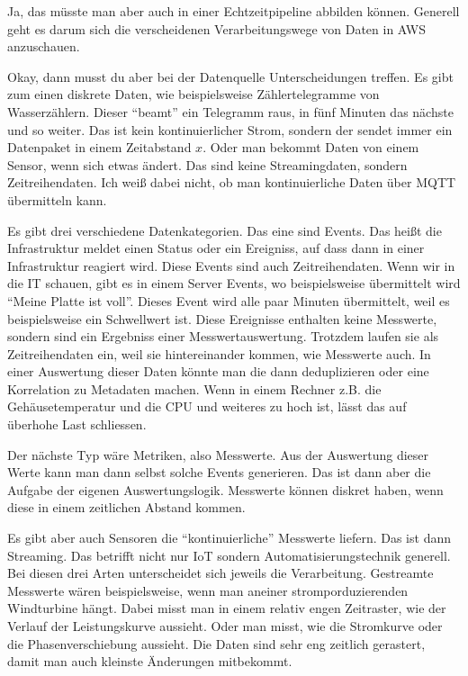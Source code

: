\LF Ja, das müsste man aber auch in einer Echtzeitpipeline abbilden können. Generell geht es darum sich die verscheidenen Verarbeitungswege von Daten in \ac{AWS} anzuschauen. 

\PE Okay, dann musst du aber bei der Datenquelle Unterscheidungen treffen. Es gibt zum einen diskrete Daten, wie beispielsweise Zählertelegramme von Wasserzählern. Dieser \enquote{beamt} ein Telegramm raus, in fünf Minuten das nächste und so weiter. Das ist kein kontinuierlicher Strom, sondern der sendet immer ein Datenpaket in einem Zeitabstand $x$. Oder man bekommt Daten von einem Sensor, wenn sich etwas ändert. Das sind keine Streamingdaten, sondern Zeitreihendaten. Ich weiß dabei nicht, ob man kontinuierliche Daten über \ac{MQTT} übermitteln kann.

Es gibt drei verschiedene Datenkategorien. Das eine sind Events. Das heißt die Infrastruktur meldet einen Status oder ein Ereigniss, auf dass dann in einer Infrastruktur reagiert wird. Diese Events sind auch Zeitreihendaten. Wenn wir in die IT schauen, gibt es in einem Server Events, wo beispielsweise übermittelt wird \enquote{Meine Platte ist voll}. Dieses Event wird alle paar Minuten übermittelt, weil es beispielsweise ein Schwellwert ist. Diese Ereignisse enthalten keine Messwerte, sondern sind ein Ergebniss einer Messwertauswertung. Trotzdem laufen sie als Zeitreihendaten ein, weil sie hintereinander kommen, wie Messwerte auch. In einer Auswertung dieser Daten könnte man die dann deduplizieren oder eine Korrelation zu Metadaten machen. Wenn in einem Rechner z.B. die Gehäusetemperatur und die CPU und weiteres zu hoch ist, lässt das auf überhohe Last schliessen. 

Der nächste Typ wäre Metriken, also Messwerte. Aus der Auswertung dieser Werte kann man dann selbst solche Events generieren. Das ist dann aber die Aufgabe der eigenen Auswertungslogik. Messwerte können diskret haben, wenn diese in einem zeitlichen Abstand kommen. 

Es gibt aber auch Sensoren die \enquote{kontinuierliche} Messwerte liefern. Das ist dann Streaming.  Das betrifft nicht nur IoT sondern Automatisierungstechnik generell. Bei diesen drei Arten unterscheidet sich jeweils die Verarbeitung. Gestreamte Messwerte wären beispielsweise, wenn man aneiner stromporduzierenden Windturbine hängt. Dabei misst man in einem relativ engen Zeitraster, wie der Verlauf der Leistungskurve aussieht. Oder man misst, wie die Stromkurve oder die Phasenverschiebung aussieht. Die Daten sind sehr eng zeitlich gerastert, damit man auch kleinste Änderungen mitbekommt. 

